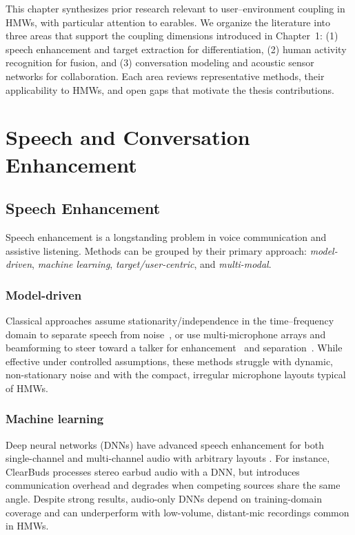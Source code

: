 This chapter synthesizes prior research relevant to user--environment coupling in HMWs, with particular attention to earables. We organize the literature into three areas that support the coupling dimensions introduced in Chapter~1: (1) speech enhancement and target extraction for differentiation, (2) human activity recognition for fusion, and (3) conversation modeling and acoustic sensor networks for collaboration. Each area reviews representative methods, their applicability to HMWs, and open gaps that motivate the thesis contributions.

\section{Speech and Conversation Enhancement}

\subsection{Speech Enhancement}
Speech enhancement is a longstanding problem in voice communication and assistive listening. Methods can be grouped by their primary approach: \textit{model-driven}, \textit{machine learning}, \textit{target/user-centric}, and \textit{multi-modal}.

\subsubsection{Model-driven}
Classical approaches assume stationarity/independence in the time--frequency domain to separate speech from noise~\cite{ephraim1995signal}, or use multi-microphone arrays and beamforming to steer toward a talker for enhancement~\cite{yousefian2014hybrid,ji2017coherence} and separation~\cite{wood2017blind,kitamura2016determined}. While effective under controlled assumptions, these methods struggle with dynamic, non-stationary noise and with the compact, irregular microphone layouts typical of HMWs.

\subsubsection{Machine learning}
Deep neural networks (DNNs) have advanced speech enhancement for both single-channel \cite{subakan2021attention} and multi-channel audio with arbitrary layouts \cite{zhang2021microphone}. For instance, ClearBuds \cite{chatterjee2022clearbuds} processes stereo earbud audio with a DNN, but introduces communication overhead and degrades when competing sources share the same angle. Despite strong results, audio-only DNNs depend on training-domain coverage and can underperform with low-volume, distant-mic recordings common in HMWs.

